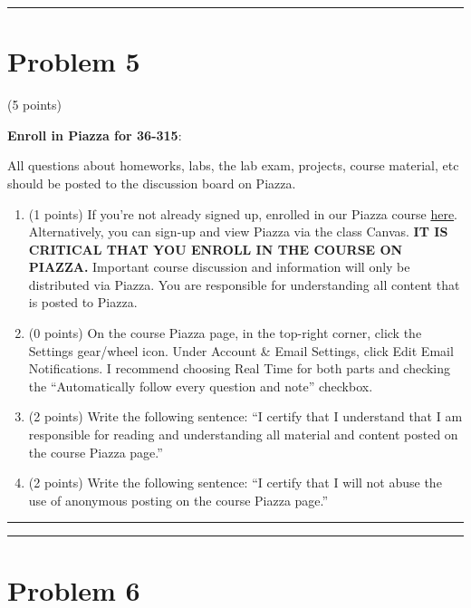 \documentclass[]{article}
\begin{document}
\begin{center}\rule{0.5\linewidth}{\linethickness}\end{center}

\hypertarget{problem-5}{%
\section{Problem 5}\label{problem-5}}

(5 points)

\textbf{Enroll in Piazza for 36-315}:

All questions about homeworks, labs, the lab exam, projects, course
material, etc should be posted to the discussion board on Piazza.

\begin{enumerate}
\def\labelenumi{\alph{enumi}.}
\item
  (1 points) If you're not already signed up, enrolled in our Piazza
  course \href{https://piazza.com/cmu/fall2018/36315}{here}.
  Alternatively, you can sign-up and view Piazza via the class Canvas.
  \textbf{IT IS CRITICAL THAT YOU ENROLL IN THE COURSE ON PIAZZA.}
  Important course discussion and information will only be distributed
  via Piazza. You are responsible for understanding all content that is
  posted to Piazza.
\item
  (0 points) On the course Piazza page, in the top-right corner, click
  the Settings gear/wheel icon. Under Account \& Email Settings, click
  Edit Email Notifications. I recommend choosing Real Time for both
  parts and checking the ``Automatically follow every question and
  note'' checkbox.
\item
  (2 points) Write the following sentence: ``I certify that I understand
  that I am responsible for reading and understanding all material and
  content posted on the course Piazza page.''
\item
  (2 points) Write the following sentence: ``I certify that I will not
  abuse the use of anonymous posting on the course Piazza page.''
\end{enumerate}

\begin{center}\rule{0.5\linewidth}{\linethickness}\end{center}

\begin{center}\rule{0.5\linewidth}{\linethickness}\end{center}

\hypertarget{problem-6}{%
\section{Problem 6}\label{problem-6}}
\end{document}
